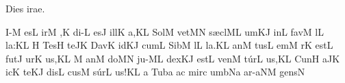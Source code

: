 
\beginhymn Dies irae.

\Internote
{}
\nosolesmescustos
\initiumgregorianum
{}%
\sgn {}I-\punctum M\egn
\sgn {}es\punctum L\egn
\spatium
\sgn {}ir\punctum M\egn
\sgn {}{\ae},\punctum K\egn
\spatium
\sgn di-\punctum L\egn
\sgn {}es\engl{}\punctum J\egn
\spatium
\sgn {}i{ll}\punctum K\egn
\sgn {}a,\punctum K\augmentum L\egn
\spatium
\divisiominor
\spatium
\sgn Sol\punctum M\egn
\sgn vet\pes MN\egn
\spatium
\sgn s{\ae}{cl}\clivis ML\egn
\sgn {}um\clivis KJ\egn
\spatium
\sgn {}in\punctum L\egn
\spatium
\sgn fav\punctum M\egn
\sgn {}{\'\i}l\punctum L\egn
\sgn la:\punctum K\augmentum L\egn
\spatium
\divisiominor
\spatium
\custos H
\Internote
\lineaproxima
\sgn Tes\punctum H\egn
\sgn te{}\pes JK\egn
\spatium
\sgn Dav\punctum K\egn
\sgn {}id\clivis KJ\egn
\spatium
\sgn cum\punctum L\egn
\spatium
\sgn Sib\punctum M\egn
{}l\punctum L\egn
\sgn la.\punctum K\augmentum L\egn
\spatium
\divisiofinalis
\spatium
{}an\punctum M\egn
\sgn tus\punctum L\egn
\spatium
{}em\punctum M\egn
{}r\punctum K\egn
\spatium
\sgn {}e{st}\punctum L\egn
\spatium
\sgn fut\punctum J\egn
\sgn {}u{r}\punctum K\egn
\sgn {}u{s,}\punctum K\augmentum L\egn
\spatium
\divisiominor
\spatium
\custos M
\lineaproxima
{}an\punctum M\egn
\sgn do{}\pes MN\egn
\spatium
\sgn ju-\clivis ML\egn
\sgn dex\clivis KJ\egn
\spatium
\sgn {}e{st}\punctum L\egn
\spatium
\sgn ven\punctum M\egn
\sgn t{\'u}r\punctum L\egn
\sgn {}u{s,}\punctum K\augmentum L\egn
\spatium
\divisiominor
\spatium
\sgn Cun\punctum H\egn
{}a{}\pes JK\egn
\spatium
{}ic\punctum K\egn
\sgn te{}\clivis KJ\egn
\spatium
\sgn dis\punctum L\egn
\sgn cus\punctum M\egn
\sgn s{\'u}r\punctum L\egn
\sgn {}u{s!}\punctum K\augmentum L\egn
\spatium
\divisiofinalis
\spatium
\custos a
\Internote
\lineaproxima
\sgn T{u}b\punctum a\egn
\sgn {}a{}\punctum c\egn
\spatium
\sgn mir\punctum c\egn
\sgn {}um\porrectus bNa\egn
\spatium
{}a{r-}\climacus aNM\egn
\sgn ge{ns}\punctum N\egn
